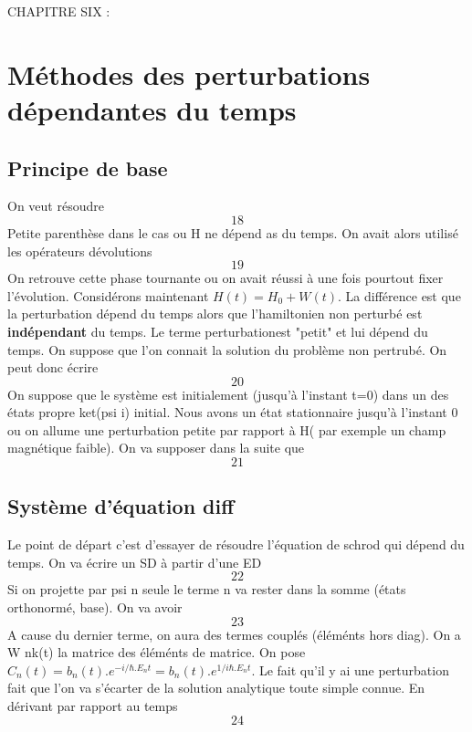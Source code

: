 
	
	
	
CHAPITRE SIX : 
\section{Méthodes des perturbations dépendantes du temps}
\subsection{Principe de base}
On veut résoudre
\begin{equation}
18
\end{equation}
Petite parenthèse dans le cas ou H ne dépend as du temps. 
On avait alors utilisé les opérateurs dévolutions
\begin{equation}
19
\end{equation}
On retrouve cette phase tournante ou on avait réussi à une 
fois pourtout fixer l'évolution. Considérons maintenant 
$H(t) = H_0 + W(t)$. La différence est que la perturbation 
dépend du temps alors que l'hamiltonien non perturbé est 
\textbf{indépendant} du temps. Le terme perturbationest 
"petit" et lui dépend du temps. On suppose que l'on connait 
la solution du problème non pertrubé. On peut donc écrire
\begin{equation}
20
\end{equation}
On suppose que le système est initialement (jusqu'à l'instant
t=0) dans un des états propre ket(psi i) initial. Nous 
avons un état stationnaire jusqu'à l'instant 0 ou on allume 
une perturbation petite par rapport à H( par exemple un champ
magnétique faible). On va supposer dans la suite que
\begin{equation}
21
\end{equation}

\subsection{Système d'équation diff}
Le point de départ c'est d'essayer de résoudre l'équation 
de schrod qui dépend du temps. On va écrire un SD à partir
d'une ED
\begin{equation}
22
\end{equation}
Si on projette par psi n seule le terme n va rester dans la 
somme (états orthonormé, base). On va avoir
\begin{equation}
23
\end{equation}
A cause du dernier terme, on aura des termes couplés (éléménts 
hors diag). On a W nk(t) la matrice des éléménts de matrice. On 
pose $C_n(t) = b_n(t).e^{-i/\hbar.E_nt}= b_n(t).e^{1/i\hbar.E_nt}$. Le fait qu'il y ai une 
perturbation fait que l'on va s'écarter de la solution analytique 
toute simple connue. En dérivant par rapport au temps
\begin{equation}
24
\end{equation}